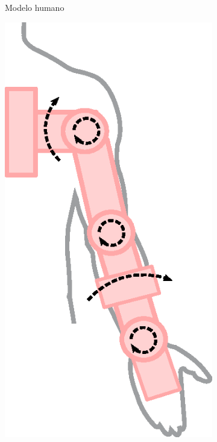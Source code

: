 \begin{figure}[!ht]
\begin{subfigure}[b]{0.31\textwidth}
         \caption{Modelo humano}
         \label{fig:modelobrazo1}
     \end{subfigure}
     \hfill
     \begin{subfigure}[b]{0.31\textwidth}
         \centering
         \includegraphics[width=\textwidth]{chapters/cap-normas/brazo2.eps}

\end{subfigure}
\end{figure}
